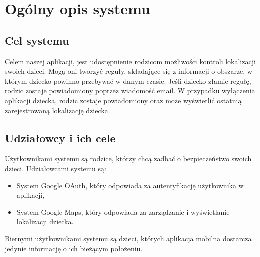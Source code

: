 \documentclass{sprawozdanie-agh}
\begin{document}

	\stronatytulowa{}

	\section{Ogólny opis systemu}

		\subsection{Cel systemu}

		Celem naszej aplikacji, jest udostępnienie rodzicom możliwości kontroli lokalizacji swoich dzieci. Mogą oni tworzyć reguły, składające się z informacji o obszarze, w którym dziecko powinno przebywać w danym czasie. Jeśli dziecko złamie regułę, rodzic zostaje powiadomiony poprzez wiadomość email. W przypadku wyłączenia aplikacji dziecka, rodzic zostaje powiadomiony oraz może wyświetlić ostatnią zarejestrowaną lokalizację dziecka.

		\subsection{Udziałowcy i ich cele}

		Użytkownikami systemu są rodzice, którzy chcą zadbać o bezpieczeństwo swoich dzieci. Udziałowcami systemu są:

		\begin{itemize}
			\item System Google OAuth, który odpowiada za autentyfikację użytkownika w aplikacji,
			\item System Google Maps, który odpowiada za zarządzanie i wyświetlanie lokalizacji dziecka.
		\end{itemize}
		Biernymi użytkownikami systemu są dzieci, których aplikacja mobilna dostarcza jedynie informację o ich bieżącym położeniu.
\end{document}
